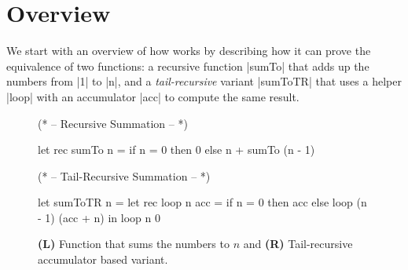 \section{Overview}
\label{s:overview}

We start with an overview of how \sys works by describing
how it can prove the equivalence of two functions: a
recursive function |sumTo| that adds up the numbers
from |1| to |n|, and a \emph{tail-recursive} variant
|sumToTR| that uses a helper |loop| with an accumulator
|acc| to compute the same result.


\begin{figure*}[t!]
\centering
\begin{minipage}[t]{0.40\textwidth}
\begin{ocode}
(* -- Recursive Summation -- *)

let rec sumTo n =
  if n = 0
    then 0
    else n + sumTo (n - 1)
\end{ocode}
\end{minipage}
\hspace{0.14in}
\begin{minipage}[t]{0.49\textwidth}
\begin{ocode}
(* -- Tail-Recursive Summation -- *)

let sumToTR n =
  let rec loop n acc =
    if n = 0
      then acc
      else loop (n - 1) (acc + n)
  in
    loop n 0
\end{ocode}
\end{minipage}
\caption{\textbf{(L)} Function that sums the numbers to $n$
         and \textbf{(R)} Tail-recursive accumulator based variant.
}
\label{fig:example}
\end{figure*}
